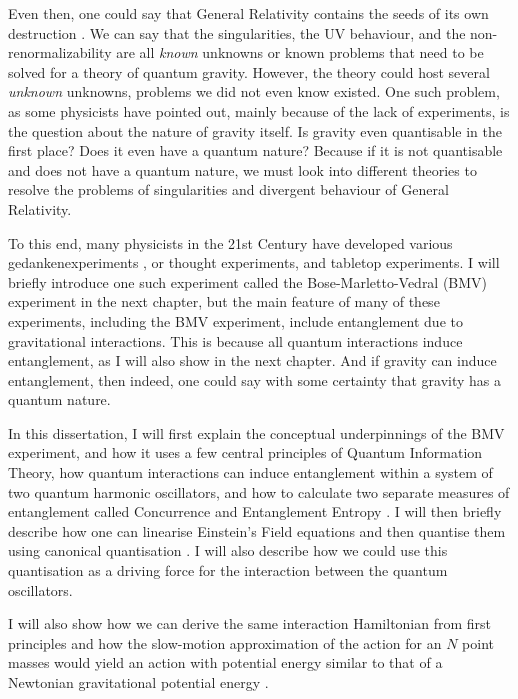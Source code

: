 \documentclass[12pt,a4paper]{report}
\theoremstyle{plain}
\theoremstyle{definition}
\theoremstyle{remark}
\begin{document}
Even then, one could say that General Relativity contains the seeds of its own destruction \cite{Tong_2009}. We can say that the singularities, the UV behaviour, and the non-renormalizability are all \textit{known} unknowns or known problems that need to be solved for a theory of quantum gravity. However, the theory could host several \textit{unknown} unknowns, problems we did not even know existed. One such problem, as some physicists have pointed out, mainly because of the lack of experiments, is the question about the nature of gravity itself. Is gravity even quantisable in the first place? Does it even have a quantum nature? Because if it is not quantisable and does not have a quantum nature, we must look into different theories to resolve the problems of singularities and divergent behaviour of General Relativity.

To this end, many physicists in the 21st Century have developed various gedankenexperiments \cite{PhysRevD.98.126009, doi:10.1142/S0218271819430016}, or thought experiments, and tabletop experiments. I will briefly introduce one such experiment called the Bose-Marletto-Vedral (BMV) \cite{Bose_2017, Marletto_2017} experiment in the next chapter, but the main feature of many of these experiments, including the BMV experiment, include entanglement due to gravitational interactions. This is because all quantum interactions induce entanglement, as I will also show in the next chapter. And if gravity can induce entanglement, then indeed, one could say with some certainty that gravity has a quantum nature.

In this dissertation, I will first explain the conceptual underpinnings of the BMV experiment, and how it uses a few central principles of Quantum Information Theory, how quantum interactions can induce entanglement within a system of two quantum harmonic oscillators, and how to calculate two separate measures of entanglement called Concurrence and Entanglement Entropy \cite{Bose_2022}. I will then briefly describe how one can linearise Einstein's Field equations and then quantise them using canonical quantisation \cite{Gupta_1952}. I will also describe how we could use this quantisation as a driving force for the interaction between the quantum oscillators.

I will also show how we can derive the same interaction Hamiltonian from first principles and how the slow-motion approximation of the action for an $N$ point masses would yield an action with potential energy similar to that of a Newtonian gravitational potential energy \cite{Christodoulou_2023b}.
\end{document}
